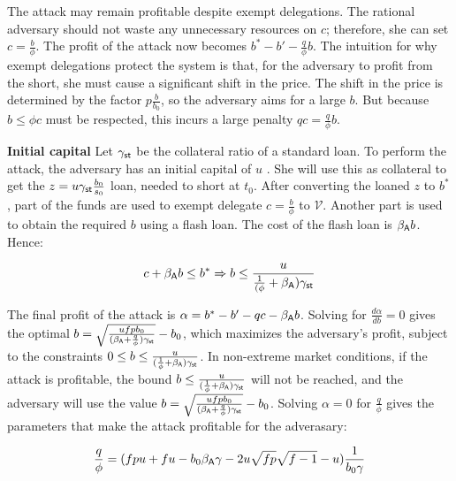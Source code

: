 The attack may remain profitable despite exempt delegations.
The rational adversary should not waste any unnecessary resources on
$c$; therefore, she can set $c = \frac{b}{\phi}$. The profit of the attack now
becomes $b^* - b' - \frac{q}{\phi}b$.
The intuition for why exempt delegations protect the system is that,
for the adversary to profit from the short, she must cause a significant
shift in the price. The shift in the price is determined by the factor
$p\frac{b}{b_0}$, so the adversary aims for a large $b$. But because $b \leq \phi c$
must be respected, this incurs a large penalty $qc = \frac{q}{\phi}b$.

\noindent
\textbf{Initial capital}
Let $\gamma_{\textsf{st}}$ be the collateral ratio of a standard \stasset
loan.
To perform the attack, the adversary has an initial capital of $u$ \asset.
She will use this as collateral to get the $z = u \gamma_{\textsf{st}} \frac{b_0}{s_0}$ \stasset
loan, needed to short \stasset at $t_0$.
After converting the loaned $z$ \stasset to $b^*$ \asset, part
of the funds are used to exempt delegate $c = \frac{b}{\phi}$ \asset
to $\mathcal{V}$. Another part
is used to obtain the required $b$ \asset using a flash loan. The cost of
the flash loan is $\beta_{\textsf{A}} b$. Hence:

\begin{gather*}
  c + \beta_{\textsf{A}} b \leq b^*\Rightarrow
  b \leq \frac{u}{\frac{1}{(\phi} + \beta_{\textsf{A}})\gamma_{\textsf{st}}}
\end{gather*}

The final profit of the attack is $\alpha = b^* - b' - qc - \beta_{\textsf{A}} b$.
Solving for $\frac{d\alpha}{db} = 0$ gives the optimal $b = \sqrt{\frac{u f p b_0}{(\beta_{\textsf{A}} + \frac{q}{\phi})\gamma_{\textsf{st}}}} - b_0$,
which maximizes
the adversary's profit, subject to the constraints
$0 \leq b \leq \frac{u}{(\frac{1}{\phi} + \beta_{\textsf{A}}) \gamma_{\textsf{st}}}$.
In non-extreme market conditions, if the attack is profitable, the bound
$b \leq \frac{u}{(\frac{1}{\phi} + \beta_{\textsf{A}})\gamma_{\textsf{st}}}$ will not be reached,
and the adversary will use the value
$b = \sqrt{\frac{u f p b_0}{(\beta_{\textsf{A}} + \frac{q}{\phi})\gamma_{\textsf{st}}}} - b_0$.
Solving $\alpha = 0$ for $\frac{q}{\phi}$ gives the parameters that make the
attack profitable for the adverasary:

\begin{gather*}
  \frac{q}{\phi} = (f p u + f u - b_0 \beta_{\textsf{A}} \gamma - 2 u \sqrt{fp} \sqrt{f - 1} - u)\frac{1}{b_0 \gamma}
\end{gather*}

